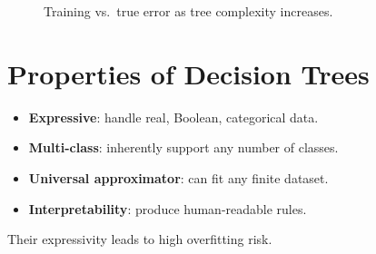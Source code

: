 \documentclass[11pt]{article}
\begin{document}
\begin{figure}[h]
\centering
{}
\caption{Training vs.\ true error as tree complexity increases.}
\end{figure}

\section{Properties of Decision Trees}
\begin{itemize}
  \item \textbf{Expressive}: handle real, Boolean, categorical data.
  \item \textbf{Multi-class}: inherently support any number of classes.
  \item \textbf{Universal approximator}: can fit any finite dataset.
  \item \textbf{Interpretability}: produce human-readable rules.
\end{itemize}
Their expressivity leads to high overfitting risk.
\end{document}
